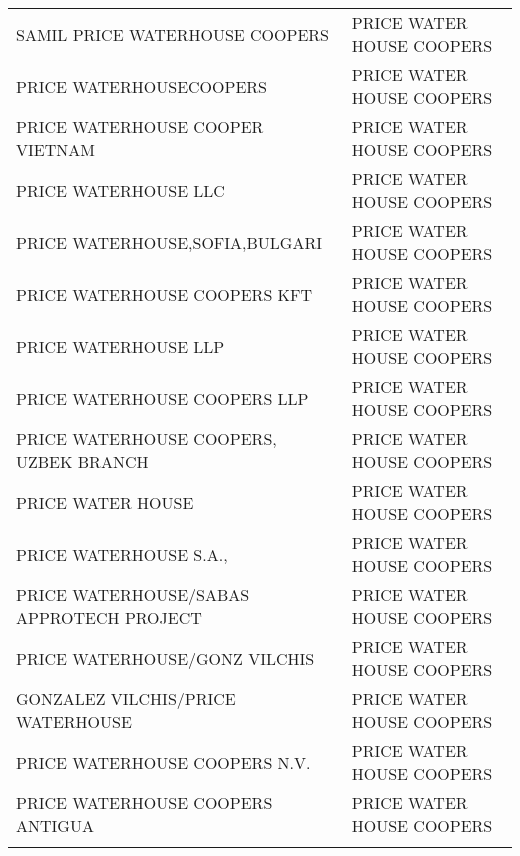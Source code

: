 \begin{longtable}{XX}
  SAMIL PRICE WATERHOUSE COOPERS & PRICE WATER HOUSE COOPERS \\
  PRICE WATERHOUSECOOPERS & PRICE WATER HOUSE COOPERS \\
  PRICE WATERHOUSE COOPER VIETNAM & PRICE WATER HOUSE COOPERS \\
  PRICE WATERHOUSE LLC & PRICE WATER HOUSE COOPERS \\
  PRICE WATERHOUSE,SOFIA,BULGARI & PRICE WATER HOUSE COOPERS \\
  PRICE WATERHOUSE COOPERS KFT & PRICE WATER HOUSE COOPERS \\
  PRICE WATERHOUSE LLP & PRICE WATER HOUSE COOPERS \\
  PRICE WATERHOUSE COOPERS LLP & PRICE WATER HOUSE COOPERS \\
  PRICE WATERHOUSE COOPERS, UZBEK BRANCH & PRICE WATER HOUSE COOPERS \\
  PRICE WATER HOUSE & PRICE WATER HOUSE COOPERS \\
  PRICE WATERHOUSE S.A., & PRICE WATER HOUSE COOPERS \\
  PRICE WATERHOUSE/SABAS APPROTECH PROJECT & PRICE WATER HOUSE COOPERS \\
  PRICE WATERHOUSE/GONZ VILCHIS & PRICE WATER HOUSE COOPERS \\
  GONZALEZ VILCHIS/PRICE WATERHOUSE & PRICE WATER HOUSE COOPERS \\
  PRICE WATERHOUSE COOPERS N.V. & PRICE WATER HOUSE COOPERS \\
  PRICE WATERHOUSE COOPERS ANTIGUA & PRICE WATER HOUSE COOPERS \\
   \hline
\hline
\label{tab_disambiguation}
\end{longtable}

